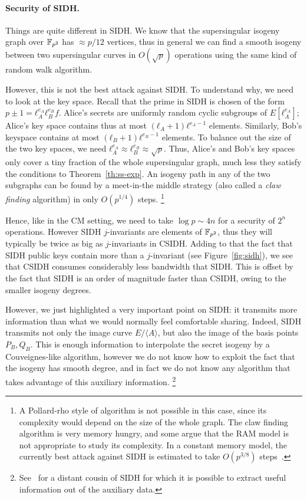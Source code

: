 \documentclass{report}
\theoremstyle{plain}
\theoremstyle{definition}
\begin{document}
\paragraph{Security of SIDH.}
Things are quite different in SIDH. %
We know that the supersingular isogeny graph over $\mathbb{F}_{p^2}$ has
$≈p/12$ vertices, thus in general we can find a smooth isogeny between
two supersingular curves in $O(\sqrt{p})$ operations using the same
kind of random walk algorithm. %

However, this is not the best attack against SIDH. %
To understand why, we need to look at the key space. %
Recall that the prime in SIDH is chosen of the form
$p±1=ℓ_A^{e_A}ℓ_B^{e_B}f$. %
Alice's secrets are uniformly random cyclic subgroups of
$E[ℓ_A^{e_A}]$; Alice's key space contains thus at most
$(ℓ_A+1)ℓ^{e_A-1}$ elements. %
Similarly, Bob's keyspace contains at most $(ℓ_B+1)ℓ^{e_B-1}$
elements. %
To balance out the size of the two key spaces, we need
$ℓ_A^{e_A}≈ℓ_B^{e_B}≈\sqrt{p}$. %
Thus, Alice's and Bob's key spaces only cover a tiny fraction of the
whole supersingular graph, much less they satisfy the conditions to
Theorem~\ref{th:ss-exp}. %
An isogeny path in any of the two subgraphs can be found by a
meet-in-the middle strategy (also called a \emph{claw finding}
algorithm) in only $O(p^{1/4})$ steps.%
\footnote{A Pollard-rho style of algorithm is not possible in this
  case, since its complexity would depend on the size of the whole
  graph. %
  The claw finding algorithm is very memory hungry, and some argue
  that the RAM model is not appropriate to study its complexity. %
  In a constant memory model, the currently best attack against SIDH
  is estimated to take $O(p^{3/8})$
  steps~\cite{cryptoeprint:2018:313}.} %

Hence, like in the CM setting, we need to take $\log p\sim 4n$ for a
security of $2^n$ operations. %
However SIDH $j$-invariants are elements of $\mathbb{F}_{p^2}$, thus they will
typically be twice as big as $j$-invariants in CSIDH. %
Adding to that the fact that SIDH public keys contain more than a
$j$-invariant (see Figure~\ref{fig:sidh}), we see that CSIDH consumes
considerably less bandwidth that SIDH. %
This is offset by the fact that SIDH is an order of magnitude faster
than CSIDH, owing to the smaller isogeny degrees. %

However, we just highlighted a very important point on SIDH: it
transmits more information than what we would normally feel
comfortable sharing. %
Indeed, SIDH transmits not only the image curve $E/〈A〉$, but also
the image of the basis points $P_B,Q_B$. %
This is enough information to interpolate the secret isogeny by a
Couveignes-like algorithm, however we do not know how to exploit the
fact that the isogeny has smooth degree, and in fact we do not know
any algorithm that takes advantage of this auxiliary information.%
\footnote{See~\cite{10.1007/978-3-319-70697-9_12} for a distant cousin
  of SIDH for which it is possible to extract useful information out
  of the auxiliary data.} %
\end{document}
